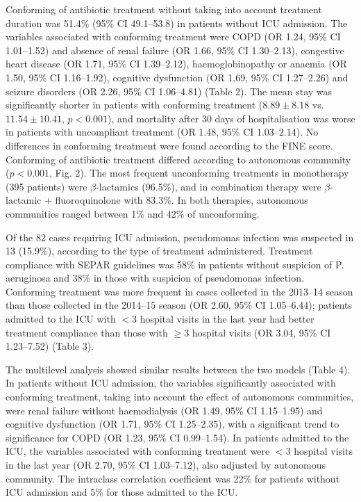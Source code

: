 \documentclass[11pt, a4paper]{article}
\begin{document}
\begin{multicols}{2}
Conforming of antibiotic treatment without taking into account treatment duration was 51.4\% (95\% CI 49.1–53.8) in patients without ICU admission. The variables associated with
conforming treatment were COPD (OR 1.24, 95\% CI 1.01–1.52) and absence of renal failure (OR 1.66, 95\% CI 1.30–2.13), congestive heart disease (OR 1.71, 95\% CI 1.39–2.12), haemoglobinopathy or anaemia (OR 1.50, 95\% CI 1.16–1.92), cognitive dysfunction (OR 1.69, 95\% CI 1.27–2.26) and seizure disorders (OR 2.26, 95\% CI 1.06–4.81) (Table 2). The mean stay was significantly shorter in patients with conforming treatment ($8.89 \pm 8.18$
vs. $11.54 \pm 10.41$, $p < 0.001$), and mortality after 30 days of hospitalisation
was worse in patients with uncompliant treatment (OR 1.48, 95\% CI 1.03–2.14). No differences in conforming treatment were found according to the FINE score. Conforming of antibiotic treatment differed according to autonomous community ($p < 0.001$, Fig. 2). The most frequent unconforming treatments in monotherapy (395 patients) were $\beta$-lactamics (96.5\%), and in combination therapy were $\beta$-lactamic + fluoroquinolone with 83.3\%. In both therapies, autonomous communities ranged between 1\% and 42\% of unconforming.

Of the 82 cases requiring ICU admission, pseudomonas infection was suspected in 13 (15.9\%), according to the type of treatment administered. Treatment compliance with SEPAR guidelines was 58\% in patients without suspicion of P. aeruginosa and 38\% in those with suspicion of pseudomonas infection. Conforming treatment was more frequent in cases collected in the 2013–14 season than those collected in the 2014–15 season (OR 2.60, 95\% CI 1.05–6.44); patients admitted to the ICU with $<3$ hospital visits in the last year had better treatment compliance than those with $\geq3$ hospital visits (OR 3.04, 95\% CI 1.23–7.52) (Table 3).

The multilevel analysis showed similar results between the two models (Table 4). In patients without ICU admission, the variables significantly associated with conforming treatment, taking into account the effect of autonomous communities, were renal failure without haemodialysis (OR 1.49, 95\% CI 1.15–1.95) and cognitive dysfunction (OR 1.71, 95\% CI 1.25–2.35), with a significant trend to significance for COPD (OR 1.23, 95\% CI 0.99–1.54). In patients admitted to the ICU, the variables associated with conforming treatment were $<3$ hospital visits in the last year (OR 2.70, 95\% CI 1.03–7.12), also adjusted by autonomous community. The intraclass correlation coefficient was 22\% for patients without ICU admission and 5\% for those admitted to the ICU.


\end{multicols}
\end{document}
